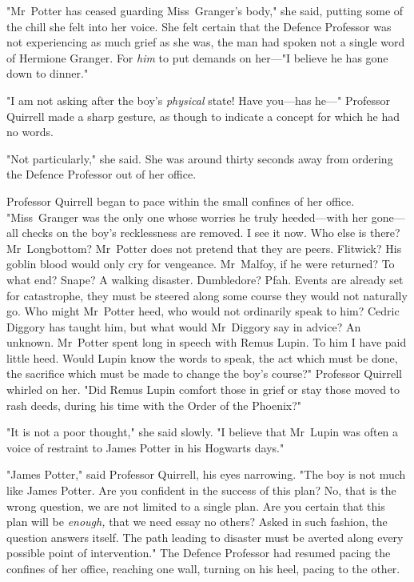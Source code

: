 "Mr~Potter has ceased guarding Miss~Granger's body," she said, putting some of
the chill she felt into her voice. She felt certain that the Defence Professor
was not experiencing as much grief as she was, the man had spoken not a single
word of Hermione Granger. For \emph{him} to put demands on her---"I believe he
has gone down to dinner."

"I am not asking after the boy's \emph{physical} state! Have you---has he---"
Professor Quirrell made a sharp gesture, as though to indicate a concept for
which he had no words.

"Not particularly," she said. She was around thirty seconds away from ordering
the Defence Professor out of her office.

Professor Quirrell began to pace within the small confines of her office.
"Miss~Granger was the only one whose worries he truly heeded---with her gone---all
checks on the boy's recklessness are removed. I see it now. Who else is there?
Mr~Longbottom? Mr~Potter does not pretend that they are peers. Flitwick? His
goblin blood would only cry for vengeance. Mr~Malfoy, if he were returned? To
what end? Snape? A walking disaster. Dumbledore? Pfah. Events are already set
for catastrophe, they must be steered along some course they would not
naturally go. Who might Mr~Potter heed, who would not ordinarily speak to him?
Cedric Diggory has taught him, but what would Mr~Diggory say in advice? An
unknown. Mr~Potter spent long in speech with Remus Lupin. To him I have paid
little heed. Would Lupin know the words to speak, the act which must be done,
the sacrifice which must be made to change the boy's course?" Professor
Quirrell whirled on her. "Did Remus Lupin comfort those in grief or stay those
moved to rash deeds, during his time with the Order of the Phoenix?"

"It is not a poor thought," she said slowly. "I believe that Mr~Lupin was
often a voice of restraint to James Potter in his Hogwarts days."

"James Potter," said Professor Quirrell, his eyes narrowing. "The boy is not
much like James Potter. Are you confident in the success of this plan? No, that
is the wrong question, we are not limited to a single plan. Are you certain
that this plan will be \emph{enough,} that we need essay no others? Asked in
such fashion, the question answers itself. The path leading to disaster must be
averted along every possible point of intervention." The Defence Professor had
resumed pacing the confines of her office, reaching one wall, turning on his
heel, pacing to the other.

